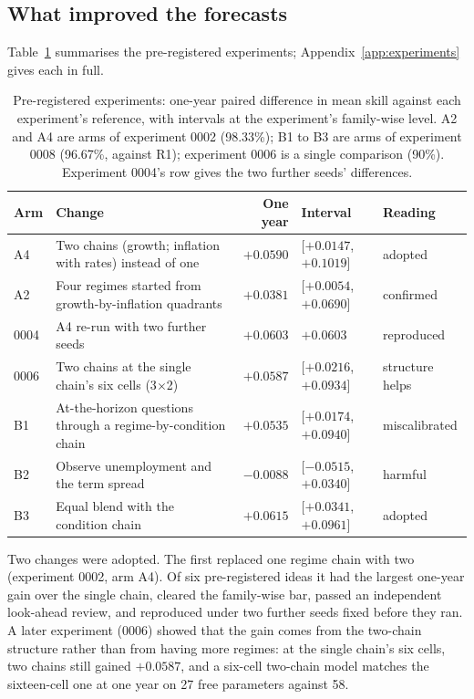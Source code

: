 \documentclass[11pt]{article}
\begin{document}
\subsection{What improved the forecasts}\label{sec:experiments}

Table~\ref{tab:experiments} summarises the pre-registered experiments; Appendix~\ref{app:experiments}
gives each in full.

\begin{table}[t]
\centering
\caption{Pre-registered experiments: one-year paired difference in mean skill against each experiment's
reference, with intervals at the experiment's family-wise level. A2 and A4 are arms of experiment 0002
(98.33\%); B1 to B3 are arms of experiment 0008 (96.67\%, against R1); experiment 0006 is a single
comparison (90\%). Experiment 0004's row gives the two further seeds' differences.}
\label{tab:experiments}
\small
\begin{tabularx}{\linewidth}{@{}lXrll@{}}
\toprule
Arm & Change & One year & Interval & Reading \\
\midrule
A4 & Two chains (growth; inflation with rates) instead of one & $+0.0590$ & [$+0.0147$, $+0.1019$] & adopted \\
A2 & Four regimes started from growth-by-inflation quadrants & $+0.0381$ & [$+0.0054$, $+0.0690$] & confirmed \\
0004 & A4 re-run with two further seeds & $+0.0603$ & $+0.0603$ & reproduced \\
0006 & Two chains at the single chain's six cells (3$\times$2) & $+0.0587$ & [$+0.0216$, $+0.0934$] & structure helps \\
B1 & At-the-horizon questions through a regime-by-condition chain & $+0.0535$ & [$+0.0174$, $+0.0940$] & miscalibrated \\
B2 & Observe unemployment and the term spread & $-0.0088$ & [$-0.0515$, $+0.0340$] & harmful \\
B3 & Equal blend with the condition chain & $+0.0615$ & [$+0.0341$, $+0.0961$] & adopted \\
\bottomrule
\end{tabularx}
\end{table}

Two changes were adopted. The first replaced one regime chain with two (experiment 0002, arm A4). Of six
pre-registered ideas it had the largest one-year gain over the single chain, cleared the family-wise
bar, passed an independent look-ahead review, and reproduced under two further seeds fixed before they
ran. A later experiment (0006) showed that the gain comes from the two-chain structure rather than from
having more regimes: at the single chain's six cells, two chains still gained $+0.0587$, and a six-cell
two-chain model matches the sixteen-cell one at one year on 27 free parameters against 58.
\end{document}
